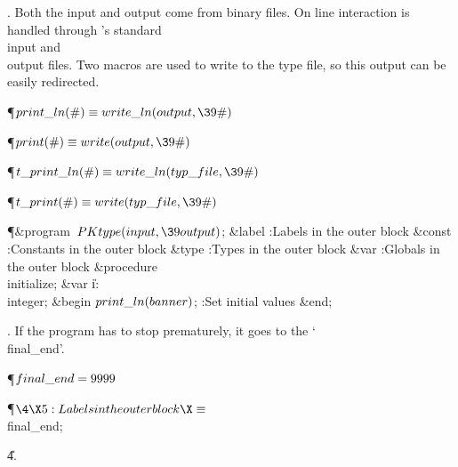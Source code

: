 . Both the input and output come from binary files.  On line interaction
is handled through \PASCAL's standard \\{input} and \\{output} files.  Two
macros
are used to write to the type file, so this output can be easily redirected.

\Y\P\D {}$\\{print\_ln}(\#)\S\\{write\_ln}(\\{output},\39\#)$\par
\P\D {}$\\{print}(\#)\S\\{write}(\\{output},\39\#)$\par
\P\D {}$\\{t\_print\_ln}(\#)\S\\{write\_ln}(\\{typ\_file},\39\#)$\par
\P\D {}$\\{t\_print}(\#)\S\\{write}(\\{typ\_file},\39\#)$\par
\Y\P\4\&{program}\1\  $\\{PKtype}(\\{input},\39\\{output})$;\6
\4\&{label} :Labels in the outer block\X\6
\4\&{const} :Constants in the outer block\X\6
\4\&{type} :Types in the outer block\X\6
\4\&{var} :Globals in the outer block\X\6
\4\&{procedure}\1\  \\{initialize};\6
\4\&{var} \|i: \\{integer};\2\6
\&{begin} $\\{print\_ln}(\\{banner})$;\6
:Set initial values\X\6
\&{end};\par
\fi

. If the program has to stop prematurely, it goes to the
`\\{final\_end}'.

\Y\P\D {}$\\{final\_end}=9999$\par
\Y\P$\4\X5:Labels in the outer block\X\S$\6
\\{final\_end};\par
\U4.\fi

